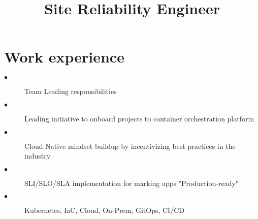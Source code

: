 \documentclass[11pt,a4paper,Hack,english]{moderncv}        %
\title{Site Reliability Engineer}%
\begin{document}
\makecvtitle
\section{Work experience}
{
	\begin{description}
		\item[$\bullet$] Team Leading responsibilities
		\item[$\bullet$] Leading initiative to onboard projects to container orchestration platform
		\item[$\bullet$] Cloud Native mindset buildup by incentivizing best practices in the industry
		\item[$\bullet$] SLI/SLO/SLA implementation for marking apps "Production-ready"
	\end{description}
}

{
	\begin{description}
		\item[$\bullet$] Kubernetes, IaC, Cloud, On-Prem, GitOps, CI/CD 
	\end{description}
}
\end{document}
